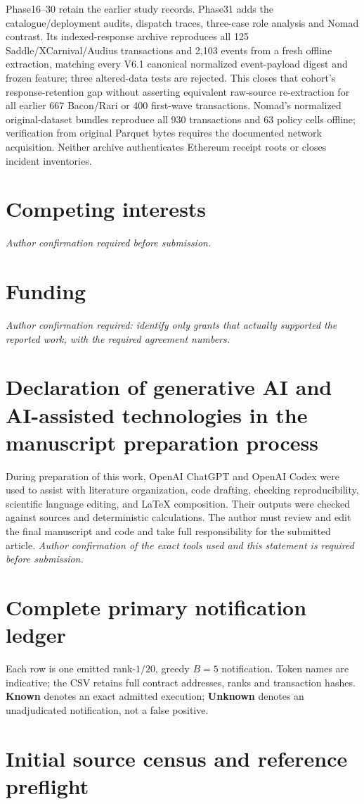 \documentclass[preprint,12pt,authoryear]{elsarticle}
\begin{document}
Phase16--30 retain the earlier study records. Phase31 adds the catalogue/deployment audits, dispatch traces, three-case role analysis and Nomad contrast. Its indexed-response archive reproduces all 125 Saddle/XCarnival/Audius transactions and 2,103 events from a fresh offline extraction, matching every V6.1 canonical normalized event-payload digest and frozen feature; three altered-data tests are rejected. This closes that cohort's response-retention gap without asserting equivalent raw-source re-extraction for all earlier 667 Bacon/Rari or 400 first-wave transactions. Nomad's normalized original-dataset bundles reproduce all 930 transactions and 63 policy cells offline; verification from original Parquet bytes requires the documented network acquisition. Neither archive authenticates Ethereum receipt roots or closes incident inventories.

\section*{Competing interests}
\textit{Author confirmation required before submission.}
\section*{Funding}
\textit{Author confirmation required: identify only grants that actually supported the reported work, with the required agreement numbers.}
\section*{Declaration of generative AI and AI-assisted technologies in the manuscript preparation process}
During preparation of this work, OpenAI ChatGPT and OpenAI Codex were used to assist with literature organization, code drafting, checking reproducibility, scientific language editing, and LaTeX composition. Their outputs were checked against sources and deterministic calculations. The author must review and edit the final manuscript and code and take full responsibility for the submitted article. \textit{Author confirmation of the exact tools used and this statement is required before submission.}

\appendix
\renewcommand{\theHtable}{appendix.\Alph{section}.\arabic{table}}
\section{Complete primary notification ledger}\label{app:alerts}
\setcounter{table}{0}
Each row is one emitted rank-$1/20$, greedy $B=5$ notification. Token names are indicative; the CSV retains full contract addresses, ranks and transaction hashes. \textbf{Known} denotes an exact admitted execution; \textbf{Unknown} denotes an unadjudicated notification, not a false positive.


\section{Initial source census and reference preflight}\label{app:sourcecensus}
\setcounter{table}{0}



\begingroup\footnotesize\setlength{\bibsep}{2pt}\sloppy\endgroup
\end{document}
